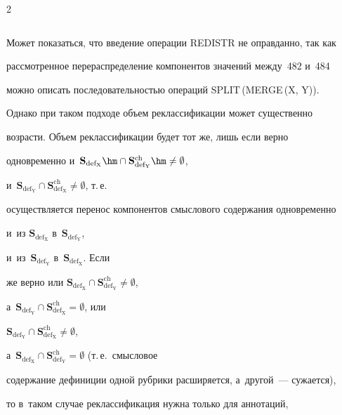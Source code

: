 \begin{multicols}{2}
\begin{table}
\begin{center}
\begin{tabular}{|l|c|p{105mm}|}
\end{tabular}


\end{center}


\end{table}





Может показаться, что введение операции \mbox{REDISTR} не оправданно, так как 


рассмотренное перераспределение компонентов значений между~482 и~484 


можно описать последовательностью операций SPLIT\,(MERGE\,(X, Y)). 


Однако при таком подходе объем реклассификации может существенно 


возрасти. Объем реклассификации будет тот же, лишь если верно 


одновременно и~$\mathbf{S}_{\mathrm{def_X}}\hm\cap 


\mathbf{S}_{\mathrm{def_Y}}^{\mathrm{ch}}\hm\not= \emptyset$, 


и~$\mathbf{S}_{\mathrm{def_Y}} \cap 


\mathbf{S}_{\mathrm{def_X}}^{\mathrm{ch}}\not= \emptyset$, т.\,е.\ 


осуществляется перенос компонентов смыслового содержания одновременно 


и~из $\mathbf{S}_{\mathrm{def_X}}$ в~$\mathbf{S}_{\mathrm{def_Y}}$, 


и~из~$\mathbf{S}_{\mathrm{def_Y}}$ в~$\mathbf{S}_{\mathrm{def_X}}$. Если 


же верно или $\mathbf{S}_{\mathrm{def_X}} \cap 


\mathbf{S}_{\mathrm{def_Y}}^{\mathrm{ch}}\not= \emptyset$, 


а~$\mathbf{S}_{\mathrm{def_Y}} \cap 


\mathbf{S}_{\mathrm{def_X}}^{\mathrm{ch}} = \emptyset$, или 


$\mathbf{S}_{\mathrm{def_Y}} \cap 


\mathbf{S}_{\mathrm{def_X}}^{\mathrm{ch}}\not= \emptyset$, 


а~$\mathbf{S}_{\mathrm{def_X}} \cap 


\mathbf{S}_{\mathrm{def_Y}}^{\mathrm{ch}}=\emptyset$ (т.\,е.\ смысловое 


содержание дефиниции одной рубрики расширяется, а~другой~--- сужается), 


то в~таком случае реклассификация нужна только для аннотаций, 



\end{multicols}
